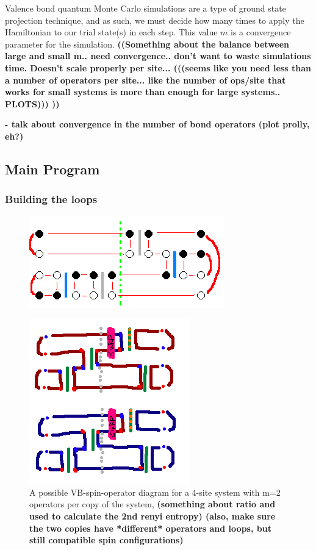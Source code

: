 \documentclass[prb,aps,twocolumn,floatfix,amsmath,amssymb,superscriptaddress,tightenlines]{revtex4}
\begin{document}
Valence bond quantum Monte Carlo simulations are a type of ground state projection technique, and as such, we must decide how many times to apply the Hamiltonian to our trial state(s) in each step.  
This value $m$ is a convergence parameter for the simulation.
{\bf ((Something about the balance between large and small m.. need convergence.. don't want to waste simulations time.  Doesn't scale properly per site...   (((seems like you need less than a number of operators per site... like the number of ops/site that works for small systems is more than enough for large systems.. PLOTS)))   )) }



\noindent
{\bf
- talk about convergence in the number of bond operators (plot prolly, eh?)\\
}

\subsection{Main Program}
\subsubsection{Building the loops}

\begin{figure} {
\includegraphics[width=2.4 in]{fig_loop_alg.png} \caption{ 
\label{loops} }
} \end{figure}


\begin{figure} {
\includegraphics[width=2.4 in]{oplist.png} \caption{ 
\label{oplist} A possible VB-spin-operator diagram for a 4-site system with m=2 operators per copy of the system, {\bf (something about ratio and used to calculate the 2nd renyi entropy)
(also, make sure the two copies have *different* operators and loops, but still compatible spin configurations)}
}
} \end{figure}
\end{document}
